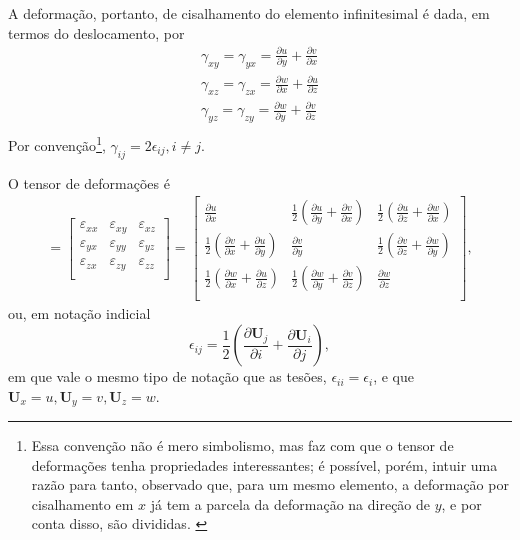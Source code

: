 A deformação, portanto, de cisalhamento do elemento infinitesimal é dada, em termos do deslocamento, por
\begin{gather}
        \gamma_{xy} = \gamma_{yx} = \frac{\partial u}{\partial y} + \frac{\partial v}{\partial x} \\
        \gamma_{xz} = \gamma_{zx} = \frac{\partial w}{\partial x} + \frac{\partial u}{\partial z} \\
        \gamma_{yz} = \gamma_{zy} = \frac{\partial w}{\partial y} + \frac{\partial v}{\partial z} \\
\end{gather}
Por convenção\footnote{Essa convenção não é mero simbolismo, mas faz com que o tensor de deformações tenha propriedades interessantes; é possível, porém, intuir uma razão para tanto, observado que, para um mesmo elemento, a deformação por cisalhamento em $x$ já tem a parcela da deformação na direção de $y$, e por conta disso, são divididas. \cite{popov} }, $\gamma_{ij} = 2 \epsilon_{ij}, i \neq j$.\cite{roylance} 

O tensor de deformações é
\begin{gather}
    [\mathbf{\epsilon}] = 
    \begin{bmatrix}
        \varepsilon_{xx} & \varepsilon_{xy} & \varepsilon_{xz} \\
        \varepsilon_{yx} & \varepsilon_{yy} & \varepsilon_{yz} \\
        \varepsilon_{zx} & \varepsilon_{zy} & \varepsilon_{zz} \\
    \end{bmatrix}
        =
    \begin{bmatrix}
        \frac{\partial u}{\partial x} & \frac{1}{2} \left(\frac{\partial u}{\partial y}+\frac{\partial v}{\partial x}\right) & \frac{1}{2} \left(\frac{\partial u}{\partial z}+\frac{\partial w}{\partial x}\right) \\
        \frac{1}{2} \left(\frac{\partial v}{\partial x}+\frac{\partial u}{\partial y}\right) & \frac{\partial v}{\partial y} & \frac{1}{2} \left(\frac{\partial v}{\partial z}+\frac{\partial w}{\partial y}\right) \\
        \frac{1}{2} \left(\frac{\partial w}{\partial x}+\frac{\partial u}{\partial z}\right) & \frac{1}{2} \left(\frac{\partial w}{\partial y}+\frac{\partial v}{\partial z}\right) & \frac{\partial w}{\partial z} \\
    \end{bmatrix},
    \label{eq:tensor_de_deformacoes}
\end{gather}
ou, em notação indicial
\begin{equation}
    \epsilon_{ij} = \frac{1}{2} \left(\frac{\partial \bm{U}_j}{\partial i} + \frac{\partial \bm{U}_i}{\partial j}\right),
\end{equation}
em que vale o mesmo tipo de notação que as tesões, $\epsilon_{ii} = \epsilon_i$, e que $\bm{U}_x = u, \bm{U}_y = v, \bm{U}_z = w$.

